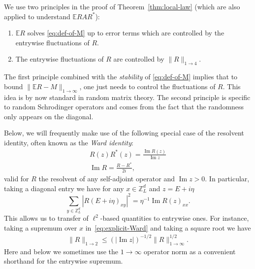\documentclass[11pt]{amsart}
\def\bbZ{{\mathbb Z}}
\def\Expec{{\mathbb E}}
\newcommand{\Impt}{\operatorname*{Im}}
\numberwithin{equation}{section}
\numberwithin{theorem}{section}
\begin{document}
We use two principles in the proof of Theorem~\ref{thm:local-law} (which are also applied
to understand $\Expec RAR^*$):
\begin{enumerate}
\item $\Expec R$ solves \eqref{eq:def-of-M} up to error terms which are
controlled by the entrywise fluctuations of $R$.
\item The entrywise fluctuations of $R$ are controlled by $\|R\|_{1\to 4}$.
\end{enumerate}
The first principle combined with the \textit{stability} of \eqref{eq:def-of-M}
implies that to bound $\|\mathbb{E}R-M\|_{1\to \infty}$, one just needs to control the fluctuations of $R$.
This idea is by now standard in random matrix theory. The second principle is specific to random
Schrodinger operators and comes from the fact that the randomness only appears on the diagonal.

Below, we will frequently make use of the following special case of the resolvent identity, often known as the \emph{Ward identity}:
\begin{align}\label{eq:Ward}
R(z) R^*(z)=\frac{\Impt R(z)}{\Impt z}\\
\nonumber\Impt R=\frac{R-R^*}{2i},
\end{align}
valid for $R$ the resolvent of any self-adjoint operator and $\Impt z > 0$.  In particular, taking a diagonal entry we have for any $x\in\bbZ^d_L$ and $z=E+i\eta$
\begin{equation}
\label{eq:explicit-Ward}
\sum_{y\in \mathbb{Z}^d_L} |R(E+i\eta)_{xy}|^2 = \eta^{-1} \Impt R(z)_{xx}.
\end{equation}
This allows us to transfer of $\ell^2$-based quantities to entrywise ones.
For instance, taking a supremum over $x$ in~\eqref{eq:explicit-Ward} and taking a square root we have
\begin{align}\label{eq:2toInftyWard}
\|R\|_{1\to 2}\leq (|\Impt z|)^{- 1/2}\|R\|_{1\to \infty}^{1 /2}.
\end{align}
Here and below we sometimes use the $1\to \infty$ operator norm as a convenient shorthand for the entrywise supremum.
\end{document}
